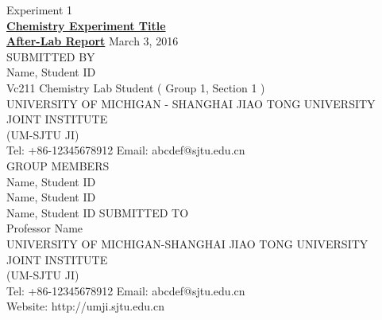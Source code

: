 \begin{titlepage}
    \begin{spacing}{1.5}
    \Large \centering  Experiment 1 \\ 
    \textbf{\Huge \uline{Chemistry Experiment Title} \\[0.2in] \uline{After-Lab Report}}
    \vfill
    \normalsize March 3, 2016 \\
    \vfill 
    \normalsize  SUBMITTED BY \\ Name, Student ID\\
    Vc211 Chemistry Lab Student ( Group 1, Section 1 ) \\
    UNIVERSITY OF MICHIGAN - SHANGHAI JIAO TONG UNIVERSITY  \\ JOINT INSTITUTE \\
    (UM-SJTU JI) \\
    Tel: +86-12345678912 Email: abcdef@sjtu.edu.cn \\ %
    \vfill
    GROUP MEMBERS \\
    Name, Student ID \\ 
    Name, Student ID \\
    Name, Student ID
    \vfill
    SUBMITTED TO\\
    Professor Name \\
    UNIVERSITY OF MICHIGAN-SHANGHAI JIAO TONG UNIVERSITY \\  JOINT INSTITUTE\\
    (UM-SJTU JI) \\
    Tel: +86-12345678912 Email: abcdef@sjtu.edu.cn \\ %
    Website: http://umji.sjtu.edu.cn \\
\end{spacing}
\end{titlepage}

